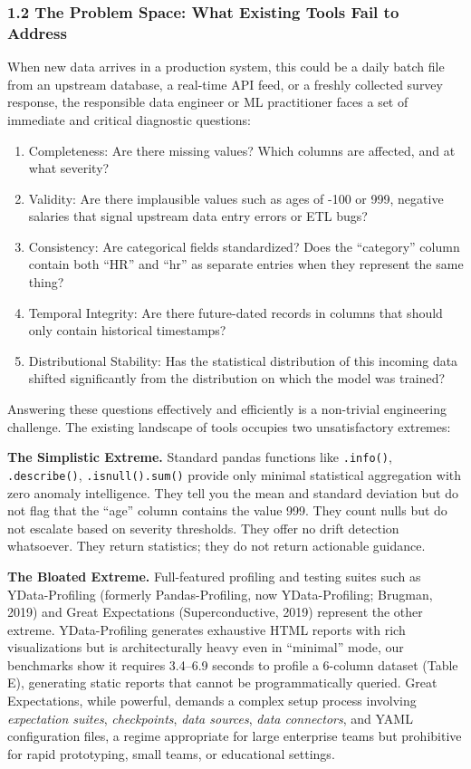 \documentclass{article}
\begin{document}
\subsubsection{1.2 The Problem Space: What Existing Tools Fail to
Address}\label{the-problem-space-what-existing-tools-fail-to-address}

When new data arrives in a production system, this could be a daily
batch file from an upstream database, a real-time API feed, or a freshly
collected survey response, the responsible data engineer or ML
practitioner faces a set of immediate and critical diagnostic questions:

\begin{enumerate}
\def\labelenumi{\arabic{enumi}.}
\item
  Completeness: Are there missing values? Which columns are affected,
  and at what severity?
\item
  Validity: Are there implausible values such as ages of -100 or 999,
  negative salaries that signal upstream data entry errors or ETL bugs?
\item
  Consistency: Are categorical fields standardized? Does the
  ``category'' column contain both ``HR'' and ``hr'' as separate entries
  when they represent the same thing?
\item
  Temporal Integrity: Are there future-dated records in columns that
  should only contain historical timestamps?
\item
  Distributional Stability: Has the statistical distribution of this
  incoming data shifted significantly from the distribution on which the
  model was trained?
\end{enumerate}

Answering these questions effectively and efficiently is a non-trivial
engineering challenge. The existing landscape of tools occupies two
unsatisfactory extremes:

\textbf{The Simplistic Extreme.} Standard pandas functions like
\texttt{.info()}, \texttt{.describe()}, \texttt{.isnull().sum()} provide
only minimal statistical aggregation with zero anomaly intelligence.
They tell you the mean and standard deviation but do not flag that the
``age'' column contains the value 999. They count nulls but do not
escalate based on severity thresholds. They offer no drift detection
whatsoever. They return statistics; they do not return actionable
guidance.

\textbf{The Bloated Extreme.} Full-featured profiling and testing suites
such as YData-Profiling (formerly Pandas-Profiling, now YData-Profiling;
Brugman, 2019) and Great Expectations (Superconductive, 2019) represent
the other extreme. YData-Profiling generates exhaustive HTML reports
with rich visualizations but is architecturally heavy even in
``minimal'' mode, our benchmarks show it requires 3.4--6.9 seconds to
profile a 6-column dataset (Table E), generating static reports that
cannot be programmatically queried. Great Expectations, while powerful,
demands a complex setup process involving \emph{expectation suites},
\emph{checkpoints}, \emph{data sources}, \emph{data connectors}, and
YAML configuration files, a regime appropriate for large enterprise
teams but prohibitive for rapid prototyping, small teams, or educational
settings.
\end{document}

